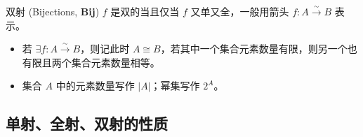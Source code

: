 \begin{defi}{双射 (Bijections, \textbf{Bij})}
    \(f\) 是双的当且仅当 \(f\) 又单又全，一般用箭头 \(f: A\stackrel{\sim}{\to }B\) 表示。
    \begin{itemize}
        \item 若 \(\exists f: A \stackrel{\sim}{\to } B\)，则记此时 \(A\cong B\)，若其中一个集合元素数量有限，则另一个也有限且两个集合元素数量相等。
        \item 集合 \(A\) 中的元素数量写作 \(|A|\)；幂集写作 \(2^A\)。
    \end{itemize}
\end{defi}

\subsection{单射、全射、双射的性质}
